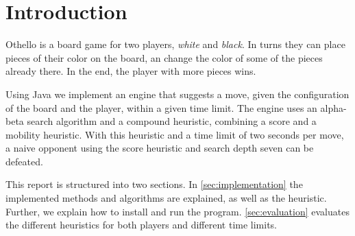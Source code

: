 \section{Introduction}

Othello is a board game for two players, \textit{white} and \textit{black}.
In turns they can place pieces of their color on the board, an change the color of some of the pieces already there.
In the end, the player with more pieces wins.

Using Java we implement an engine that suggests a move, given the configuration of the board and the player, within a given time limit.
The engine uses an alpha-beta search algorithm and a compound heuristic, combining a score and a mobility heuristic.
With this heuristic and a time limit of two seconds per move, a naive opponent using the score heuristic and search depth seven can be defeated.

This report is structured into two sections.
In \cref{sec:implementation} the implemented methods and algorithms are explained, as well as the heuristic.
Further, we explain how to install and run the program.
\cref{sec:evaluation} evaluates the different heuristics for both players and different time limits.
